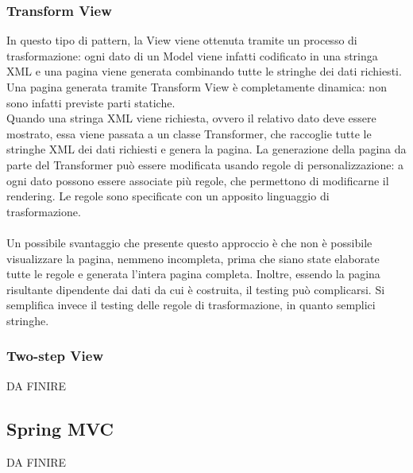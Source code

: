 \subsubsection{Transform View}
In questo tipo di pattern, la View viene ottenuta tramite un processo di trasformazione: ogni dato di un Model viene infatti codificato in una stringa XML e una pagina viene generata combinando tutte le stringhe dei dati richiesti. Una pagina generata tramite Transform View è completamente dinamica: non sono infatti previste parti statiche.
\\
Quando una stringa XML viene richiesta, ovvero il relativo dato deve essere mostrato, essa viene passata a un classe Transformer, che raccoglie tutte le stringhe XML dei dati richiesti e genera la pagina.
La generazione della pagina da parte del Transformer può essere modificata usando regole di personalizzazione: a ogni dato possono essere associate più regole, che permettono di modificarne il rendering.
Le regole sono specificate con un apposito linguaggio di trasformazione.\\
\\
Un possibile svantaggio che presente questo approccio è che non è possibile visualizzare la pagina, nemmeno incompleta, prima che siano state elaborate tutte le regole e generata l'intera pagina completa.
Inoltre, essendo la pagina risultante dipendente dai dati da cui è costruita, il testing può complicarsi. Si semplifica invece il testing delle regole di trasformazione, in quanto semplici stringhe.

\subsubsection{Two-step View}
DA FINIRE

\subsection{Spring MVC}
DA FINIRE